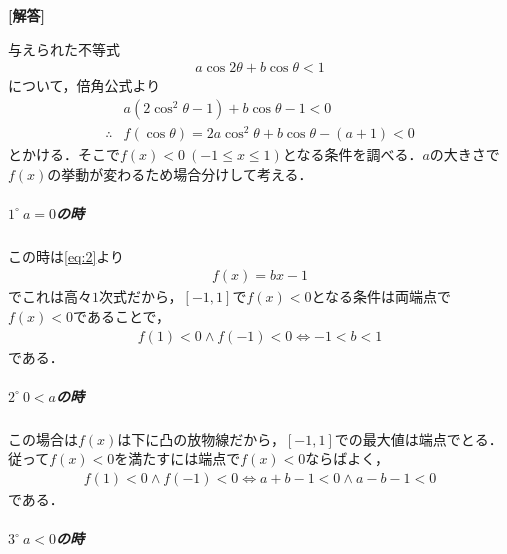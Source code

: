 \documentclass[../../main.tex]{subfiles}
\begin{document}
\begin{oframed}
  
\end{oframed}

{\bf [解答]}

与えられた不等式
\begin{align}
  a\cos 2\theta + b\cos\theta < 1 \label{eq:1}
\end{align}
について，倍角公式より
\begin{align}
  & a(2\cos^2\theta - 1) + b\cos\theta - 1 < 0 \\
  \therefore
  & f(\cos\theta) = 2a\cos^2\theta + b\cos\theta - (a+1) < 0 \label{eq:2}
\end{align}
とかける．そこで$f(x)<0 \ (-1 \le x \le 1)$となる条件を調べる．$a$の大きさで$f(x)$の挙動が変わるため場合分けして考える．

\subparagraph{$1^\circ \ a=0$の時}

この時は\cref{eq:2}より
\begin{align}
  f(x) = bx - 1
\end{align}
でこれは高々$1$次式だから，$[-1,1]$で$f(x)<0$となる条件は両端点で$f(x)<0$であることで，
\begin{align}
  f(1) < 0 \land f(-1) < 0  \iff  -1 < b < 1 \label{eq:3}
\end{align}
である．

\subparagraph{$2^\circ \ 0<a$の時}

この場合は$f(x)$は下に凸の放物線だから，$[-1,1]$での最大値は端点でとる．
従って$f(x)<0$を満たすには端点で$f(x)<0$ならばよく，
\begin{align}
  f(1) < 0 \land f(-1) < 0
  \iff  a+b-1 < 0 \land a-b-1 < 0 \label{eq:4}
\end{align}
である．

\subparagraph{$3^\circ \ a<0$の時}
\end{document}
